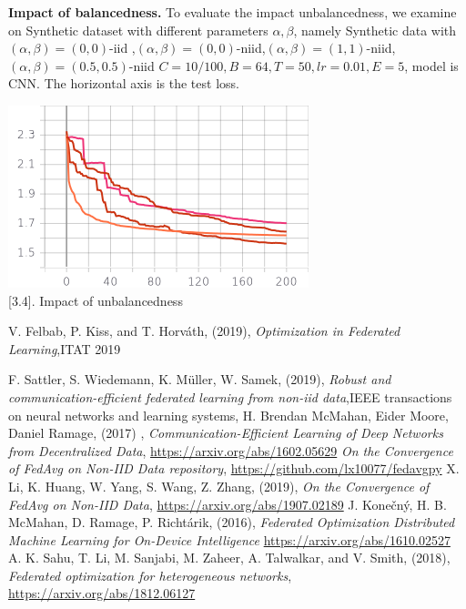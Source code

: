 \documentclass{article}
\theoremstyle{theorem}
\theoremstyle{definition}
\begin{document}
\textbf{Impact of balancedness.} To evaluate the impact unbalancedness, we examine on Synthetic dataset with different parameters $\alpha , \beta$, namely Synthetic data with $(\alpha, \beta) =(0,0)$-iid ,$(\alpha, \beta) =(0,0)$-niid,$(\alpha, \beta) =(1,1)$-niid,$(\alpha, \beta) =(0.5,0.5)$-niid $C=10/100, B=64, T=50,lr=0.01, E=5$, model is CNN. The horizontal axis is the test loss.
\begin{center}
		\includegraphics[scale=0.65]{syn.png}\\
\figurename[3.4]{. Impact of unbalancedness}
\end{center}
	\begin{thebibliography}{5}
	V. Felbab, P. Kiss, and T. Horváth, (2019), \textit{Optimization in Federated Learning},ITAT 2019
	
	
	F. Sattler, S. Wiedemann, K. Müller, W. Samek,  (2019), \textit{Robust and communication-efficient federated learning from non-iid data},IEEE transactions on neural networks and learning systems,
	H. Brendan McMahan, Eider Moore, Daniel Ramage, (2017) , \textit{Communication-Efficient Learning of Deep Networks
		from Decentralized Data}, \href{https://arxiv.org/abs/1602.05629}{https://arxiv.org/abs/1602.05629}	
	\textit{On the Convergence of FedAvg on Non-IID Data
		repository}, \href{ https://github.com/lx10077/fedavgpy }{https://github.com/lx10077/fedavgpy}	
	X. Li, K. Huang, W. Yang, S. Wang, Z. Zhang, (2019),  \textit{On the Convergence of FedAvg on Non-IID Data}, \href{https://arxiv.org/abs/1907.02189}{https://arxiv.org/abs/1907.02189}
	J. Konečný, H. B. McMahan, D. Ramage, P. Richtárik, (2016),  \textit{	Federated Optimization Distributed Machine Learning for On-Device Intelligence} \href{https://arxiv.org/abs/1610.02527}{https://arxiv.org/abs/1610.02527}
	A. K. Sahu, T. Li, M. Sanjabi, M. Zaheer, A. Talwalkar, and V. Smith, (2018), 
	\textit{Federated optimization for heterogeneous networks}, \href{https://arxiv.org/abs/1812.06127}{https://arxiv.org/abs/1812.06127}
\end{thebibliography}
\end{document}
